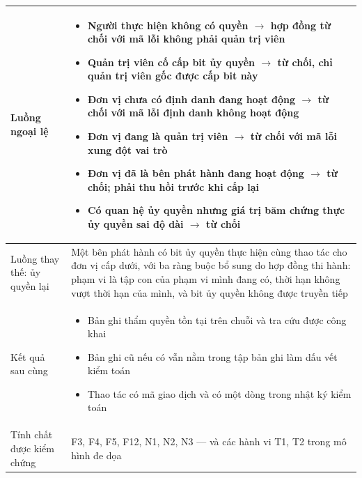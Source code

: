 \begin{longtable}{|p{3.4cm}|p{10.3cm}|}
Luồng ngoại lệ &
\begin{itemize}[leftmargin=*, nosep]
    \item Người thực hiện không có quyền $\rightarrow$ hợp đồng từ chối với mã lỗi không phải quản trị viên
    \item Quản trị viên cố cấp bit ủy quyền $\rightarrow$ từ chối, chỉ quản trị viên gốc được cấp bit này
    \item Đơn vị chưa có định danh đang hoạt động $\rightarrow$ từ chối với mã lỗi định danh không hoạt động
    \item Đơn vị đang là quản trị viên $\rightarrow$ từ chối với mã lỗi xung đột vai trò
    \item Đơn vị đã là bên phát hành đang hoạt động $\rightarrow$ từ chối; phải thu hồi trước khi cấp lại
    \item Có quan hệ ủy quyền nhưng giá trị băm chứng thực ủy quyền sai độ dài $\rightarrow$ từ chối
\end{itemize} \\
\hline

Luồng thay thế: ủy quyền lại &
Một bên phát hành có bit ủy quyền thực hiện cùng thao tác cho đơn vị cấp dưới, với ba ràng buộc bổ sung do hợp đồng thi hành: phạm vi là tập con của phạm vi mình đang có, thời hạn không vượt thời hạn của mình, và bit ủy quyền không được truyền tiếp \\
\hline

Kết quả sau cùng &
\begin{itemize}[leftmargin=*, nosep]
    \item Bản ghi thẩm quyền tồn tại trên chuỗi và tra cứu được công khai
    \item Bản ghi cũ nếu có vẫn nằm trong tập bản ghi làm dấu vết kiểm toán
    \item Thao tác có mã giao dịch và có một dòng trong nhật ký kiểm toán
\end{itemize} \\
\hline

Tính chất được kiểm chứng &
F3, F4, F5, F12, N1, N2, N3 --- và các hành vi T1, T2 trong mô hình đe dọa \\
\hline

\end{longtable}
